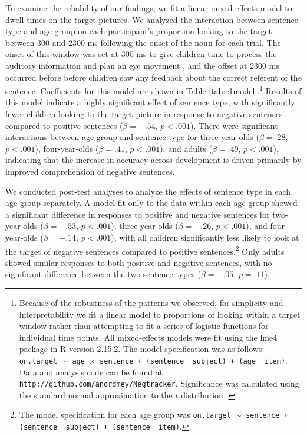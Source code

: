 \documentclass[man]{apa2}
\begin{document}
To examine the reliability of our findings, we fit a linear mixed-effects model to dwell times on the target pictures. We analyzed the interaction between sentence type and age group on each participant's proportion looking to the target between 300 and 2300 ms following the onset of the noun for each trial.  The onset of this window was set at 300 ms to give children time to process the auditory information and plan an eye movement \cite{fernald2008, haith1993}, and the offset at 2300 ms occurred before before children saw any feedback about the correct referent of the sentence.   Coefficients for this model are shown in Table \ref{tab:e1model}.\footnote{Because of the robustness of the patterns we observed, for simplicity and interpretability we fit a linear model to proportions of looking within a target window rather than attempting to fit a series of logistic functions for individual time points. All mixed-effects models were fit using the lme4 package in R version 2.15.2.  The model specification was as follows: \texttt{on.target $\sim$ age~$\times$~sentence + (sentence~\textbar~subject) +  (age~\textbar~item)}. Data and analysis code can be found at \texttt{http://github.com/anordmey/Negtracker}.  Significance was calculated using the standard normal approximation to the $t$ distribution \cite{barr2013}.} Results of this model indicate a highly significant effect of sentence type, with significantly fewer children looking to the target picture in response to negative sentences compared to positive sentences ($\beta= -.54$, $p< .001$).   There were significant interactions between age group and sentence type for three-year-olds ($\beta = .28$, $p< .001$), four-year-olds ($\beta = .41$, $p< .001$), and adults ($\beta = .49$, $p< .001$), indicating that the increase in accuracy across development is driven primarily by improved comprehension of negative sentences.  

We conducted post-test analyses to analyze the effects of sentence type in each age group separately.  A model fit only to the data within each age group showed a significant difference in responses to positive and negative sentences for two-year-olds ($\beta = -.53$, $p< .001$), three-year-olds ($\beta = -.26$, $p< .001$), and four-year-olds ($\beta = -.14$, $p< .001$), with all children significantly less likely to look at the target of negative sentences compared to positive sentences.\footnote{The model specification for each age group was \texttt{on.target $\sim$ sentence + (sentence~\textbar~subject) +  (sentence~\textbar~item)}.}  Only adults showed similar responses to both positive and negative sentences, with no significant difference between the two sentence types ($\beta = -.05$, $p=.11$).  
\end{document}
